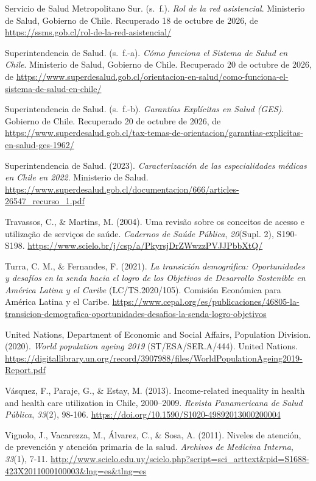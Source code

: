 \documentclass[
  spanish,
  a4paper,
  oneside]{scrbook}
\newlength{\cslhangindent}
\newenvironment{CSLReferences}[2] %
 {\begin{list}{}{%
  \setlength{\itemindent}{0pt}
  \setlength{\leftmargin}{0pt}
  \setlength{\parsep}{0pt}
  \ifodd #1
   \setlength{\leftmargin}{\cslhangindent}
   \setlength{\itemindent}{-1\cslhangindent}
  \fi
  \setlength{\itemsep}{#2\baselineskip}}}
 {\end{list}}
\begin{document}
\begin{CSLReferences}{1}{0}
Servicio de Salud Metropolitano Sur. (s.~f.). \emph{Rol de la red
asistencial}. Ministerio de Salud, Gobierno de Chile. Recuperado 18 de
octubre de 2026, de \url{https://ssms.gob.cl/rol-de-la-red-asistencial/}

Superintendencia de Salud. (s.~f.-a). \emph{Cómo funciona el Sistema de
Salud en Chile}. Ministerio de Salud, Gobierno de Chile. Recuperado 20
de octubre de 2026, de
\url{https://www.superdesalud.gob.cl/orientacion-en-salud/como-funciona-el-sistema-de-salud-en-chile/}

Superintendencia de Salud. (s.~f.-b). \emph{Garantías Explícitas en
Salud ({GES})}. Gobierno de Chile. Recuperado 20 de octubre de 2026, de
\url{https://www.superdesalud.gob.cl/tax-temas-de-orientacion/garantias-explicitas-en-salud-ges-1962/}

Superintendencia de Salud. (2023). \emph{Caracterización de las
especialidades médicas en Chile en 2022}. Ministerio de Salud.
\url{https://www.superdesalud.gob.cl/documentacion/666/articles-26547_recurso_1.pdf}

Travassos, C., \& Martins, M. (2004). Uma revisão sobre os conceitos de
acesso e utilização de serviços de saúde. \emph{Cadernos de Saúde
Pública}, \emph{20}(Supl. 2), S190-S198.
\url{https://www.scielo.br/j/csp/a/PkyrsjDrZWwzzPVJJPbbXtQ/}

Turra, C. M., \& Fernandes, F. (2021). \emph{La transición demográfica:
Oportunidades y desafíos en la senda hacia el logro de los Objetivos de
Desarrollo Sostenible en América Latina y el Caribe} (LC/TS.2020/105).
Comisión Económica para América Latina y el Caribe.
\url{https://www.cepal.org/es/publicaciones/46805-la-transicion-demografica-oportunidades-desafios-la-senda-logro-objetivos}

United Nations, Department of Economic and Social Affairs, Population
Division. (2020). \emph{World population ageing 2019}
(ST/ESA/SER.A/444). United Nations.
\url{https://digitallibrary.un.org/record/3907988/files/WorldPopulationAgeing2019-Report.pdf}

Vásquez, F., Paraje, G., \& Estay, M. (2013). Income-related inequality
in health and health care utilization in {Chile}, 2000--2009.
\emph{Revista Panamericana de Salud Pública}, \emph{33}(2), 98-106.
\url{https://doi.org/10.1590/S1020-49892013000200004}

Vignolo, J., Vacarezza, M., Álvarez, C., \& Sosa, A. (2011). Niveles de
atención, de prevención y atención primaria de la salud. \emph{Archivos
de Medicina Interna}, \emph{33}(1), 7-11.
\url{http://www.scielo.edu.uy/scielo.php?script=sci_arttext&pid=S1688-423X2011000100003&lng=es&tlng=es}

\end{CSLReferences}


\backmatter

\mainmatter
\pagestyle{scrheadings}

\end{document}
